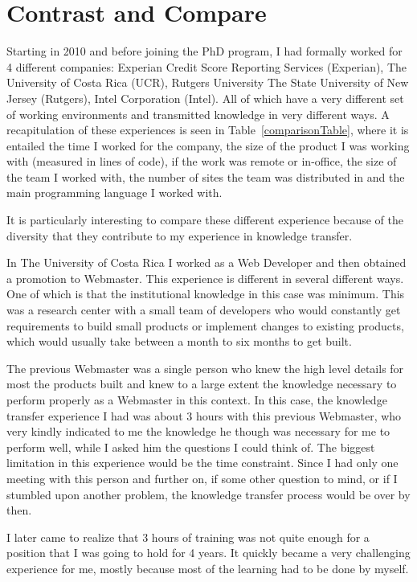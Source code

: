 \documentclass[12pt, letterpaper]{article}
\begin{document}
\section{Contrast and Compare}
Starting in 2010 and before joining the PhD program, I had formally worked for 4 different companies: Experian Credit 
Score Reporting Services (Experian), The University of Costa Rica (UCR), Rutgers University The State University of New 
Jersey (Rutgers), Intel Corporation (Intel). All of which 
have a very different set of working environments and transmitted knowledge in very different ways. A recapitulation of
these experiences is seen in Table~\ref{comparisonTable}, where it is entailed the time I worked for the company, the 
size of the product I was working with (measured in lines of code), if the work was remote or in-office, the size of the 
team I worked with, the number of sites the team was distributed in and the main programming language I worked with.

It is particularly interesting to compare these different experience because of the diversity that they contribute
to my experience in knowledge transfer.

In The University of Costa Rica I worked as a Web Developer and then obtained a promotion to Webmaster. 
This experience is different in several different ways. One of which is that the institutional knowledge 
in this case was minimum.
This was a research center with a small team of developers who would constantly get requirements to build small products 
or implement changes to existing products, which would usually take between a month to six months to get built.

The previous Webmaster was a single person who knew the high level details for most the products built and knew to a 
large extent the knowledge necessary to perform properly as a Webmaster in this context.
In this case, the knowledge transfer experience I had was about 3 hours with this previous Webmaster, who very kindly
indicated to me the knowledge he though was necessary for me to perform well, while I asked him the questions I could 
think of. The biggest limitation in this experience would be the time constraint. Since I had only one meeting with 
this person and further on, if some other question to mind, or if I stumbled upon another problem, the knowledge
transfer process would be over by then.

I later came to realize that 3 hours of training was not quite enough for a position that I was going to hold for 4
years. It quickly became a very challenging experience for me, mostly because most of the learning had to be done 
by myself.
\end{document}
